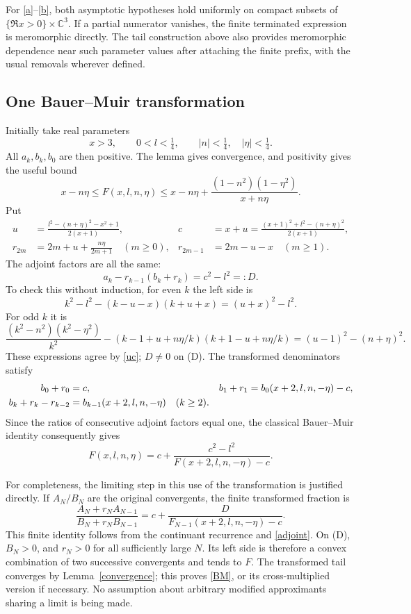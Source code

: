 \documentclass[11pt]{article}
\begin{document}
For \eqref{a}--\eqref{b}, both asymptotic hypotheses hold uniformly
on compact subsets of \(\{\Re x>0\}\times\mathbb C^3\).
If a partial numerator vanishes, the finite terminated expression
is meromorphic directly. The tail construction above also provides
meromorphic dependence near such parameter values after attaching
the finite prefix, with the usual removals wherever defined.

\subsection*{One Bauer--Muir transformation}
Initially take real parameters
\[
 x>3,\qquad 0<l<\tfrac14,\qquad
 |n|<\tfrac14,\quad |\eta|<\tfrac14.
\tag{D}
\]
All \(a_k,b_k,b_0\) are then positive. The lemma gives convergence,
and positivity gives the useful bound
\begin{equation}
 x-n\eta\le F(x,l,n,\eta)
      \le x-n\eta+\frac{(1-n^2)(1-\eta^2)}{x+n\eta}.
\label{bound}
\end{equation}
Put
\begin{align}
 u&=\frac{l^2-(n+\eta)^2-x^2+1}{2(x+1)},&
 c&=x+u=\frac{(x+1)^2+l^2-(n+\eta)^2}{2(x+1)},\label{uc}\\
 r_{2m}&=2m+u+\frac{n\eta}{2m+1}\quad(m\ge0),&
 r_{2m-1}&=2m-u-x\quad(m\ge1).\label{r}
\end{align}
The adjoint factors are all the same:
\begin{equation}
 a_k-r_{k-1}(b_k+r_k)=c^2-l^2=:D.
\label{adjoint}
\end{equation}
To check this without induction, for even \(k\) the left side is
\[
 k^2-l^2-(k-u-x)(k+u+x)=(u+x)^2-l^2.
\]
For odd \(k\) it is
\[
 \frac{(k^2-n^2)(k^2-\eta^2)}{k^2}
 -(k-1+u+n\eta/k)(k+1-u+n\eta/k)
 =(u-1)^2-(n+\eta)^2.
\]
These expressions agree by \eqref{uc}; \(D\ne0\) on (D).
The transformed denominators satisfy
\begin{align}
 b_0+r_0&=c,&
 b_1+r_1&=b_0(x+2,l,n,-\eta)-c,\notag\\
 b_k+r_k-r_{k-2}&=b_{k-1}(x+2,l,n,-\eta)\quad(k\ge2).
\label{denominators}
\end{align}
Since the ratios of consecutive adjoint factors equal one,
the classical Bauer--Muir identity
\cite[Lemma 3.1, p.~8]{CTZ} consequently gives
\begin{equation}
 F(x,l,n,\eta)
   =c+\frac{c^2-l^2}{F(x+2,l,n,-\eta)-c}.
\label{BM}
\end{equation}

For completeness, the limiting step in this use of the transformation
is justified directly. If \(A_N/B_N\) are the original convergents,
the finite transformed fraction is
\[
 \frac{A_N+r_NA_{N-1}}{B_N+r_NB_{N-1}}
 =c+\frac{D}{F_{N-1}(x+2,l,n,-\eta)-c}.
\]
This finite identity follows from the continuant recurrence and
\eqref{adjoint}. On (D), \(B_N>0\), and \(r_N>0\) for all sufficiently
large \(N\). Its left side is therefore a convex combination of two
successive convergents and tends to \(F\). The transformed tail
converges by Lemma~\ref{convergence}; this proves \eqref{BM}, or its
cross-multiplied version if necessary. No assumption about arbitrary
modified approximants sharing a limit is being made.
\end{document}
